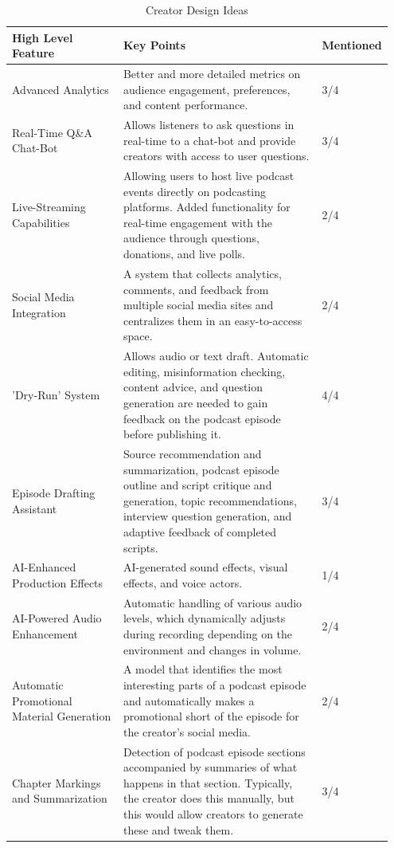 \documentclass[12pt]{report}
\begin{document}
\begin{myfont}
        \clearpage
        \begin{longtable}{p{0.3\linewidth} | p{0.55\linewidth} | p{0.1\linewidth} }
            \caption{Creator Design Ideas}
            \label{tab:creator_design_ideas}\\
            \toprule
            \textbf{High Level Feature} & \textbf{Key Points} & \textbf{Mentioned} \\
            \midrule
            Advanced Analytics & Better and more detailed metrics on audience engagement, preferences, and content performance. & 3/4\\
            \midrule
            Real-Time Q\&A Chat-Bot & Allows listeners to ask questions in real-time to a chat-bot and provide creators with access to user questions. & 3/4\\
            \midrule
            Live-Streaming Capabilities & Allowing users to host live podcast events directly on podcasting platforms. Added functionality for real-time engagement with the audience through questions, donations, and live polls. & 2/4\\
            \midrule
            Social Media Integration & A system that collects analytics, comments, and feedback from multiple social media sites and centralizes them in an easy-to-access space. & 2/4\\
            \midrule
            'Dry-Run' System & Allows audio or text draft. Automatic editing, misinformation checking, content advice, and question generation are needed to gain feedback on the podcast episode before publishing it. & 4/4\\
            \midrule
            Episode Drafting Assistant & Source recommendation and summarization, podcast episode outline and script critique and generation, topic recommendations, interview question generation, and adaptive feedback of completed scripts. & 3/4 \\
            \midrule
            AI-Enhanced Production Effects & AI-generated sound effects, visual effects, and voice actors. & 1/4\\
            \midrule
            AI-Powered Audio Enhancement & Automatic handling of various audio levels, which dynamically adjusts during recording depending on the environment and changes in volume. & 2/4 \\
            \midrule 
            Automatic Promotional Material Generation & A model that identifies the most interesting parts of a podcast episode and automatically makes a promotional short of the episode for the creator's social media. & 2/4\\
            \midrule
            Chapter Markings and Summarization & Detection of podcast episode sections accompanied by summaries of what happens in that section. Typically, the creator does this manually, but this would allow creators to generate these and tweak them. & 3/4\\
            \bottomrule
        \end{longtable}


\end{myfont}
\end{document}
